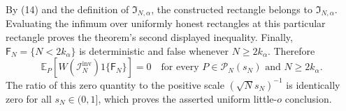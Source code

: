 By (14) and the definition of \(\mathfrak I_{N,\alpha}\), the constructed rectangle belongs to \(\mathfrak I_{N,\alpha}\).  Evaluating the infimum over uniformly honest rectangles at this particular rectangle proves the theorem's second displayed inequality.  Finally, \(\mathsf F_N=\{N<2k_\alpha\}\) is deterministic and false whenever \(N\geq2k_\alpha\).  Therefore
\[
 \mathbb E_P\!\left[W(\mathcal I_N^{\mathrm{inv}})1\{\mathsf F_N\}\right]=0
 \quad\text{for every }P\in\mathcal P_N(s_N)\text{ and }N\geq2k_\alpha.
\]
The ratio of this zero quantity to the positive scale \((\sqrt N s_N)^{-1}\) is identically zero for all \(s_N\in(0,1]\), which proves the asserted uniform little-\(o\) conclusion.
